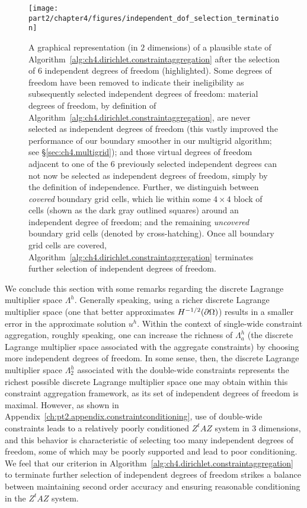 \begin{figure}[htbp]
\begin{center}
\texttt{[image: part2/chapter4/figures/independent\_dof\_selection\_termination]}
\caption{A graphical representation (in $2$ dimensions) of a plausible state of Algorithm~\ref{alg:ch4.dirichlet.constraintaggregation} after the selection of $6$ independent degrees of freedom (highlighted). Some degrees of freedom have been removed to indicate their ineligibility as subsequently selected independent degrees of freedom: material degrees of freedom, by definition of Algorithm~\ref{alg:ch4.dirichlet.constraintaggregation}, are never selected as independent degrees of freedom (this vastly improved the performance of our boundary smoother in our multigrid algorithm; see \S\ref{sec:ch4.multigrid}); and those virtual degrees of freedom adjacent to one of the $6$ previously selected independent degrees can not now be selected as independent degrees of freedom, simply by the definition of independence. Further, we distinguish between \emph{covered} boundary grid cells, which lie within some $4 \times 4$ block of cells (shown as the dark gray outlined squares) around an independent degree of freedom; and the remaining \emph{uncovered} boundary grid cells (denoted by cross-hatching). Once all boundary grid cells are covered, Algorithm~\ref{alg:ch4.dirichlet.constraintaggregation} terminates further selection of independent degrees of freedom.}
\label{fig:ch4.indydoftermination}
\end{center}
\end{figure}

We conclude this section with some remarks regarding the discrete Lagrange multiplier space $\Lambda^h$. Generally speaking, using a richer discrete Lagrange multiplier space (one that better approximates $H^{-1/2}(\partial\Omega)$) results in a smaller error in the approximate solution $u^h$. Within the context of single-wide constraint aggregation, roughly speaking, one can increase the richness of $\Lambda^h_a$ (the discrete Lagrange multiplier space associated with the aggregate constraints) by choosing more independent degrees of freedom. In some sense, then, the discrete Lagrange multiplier space $\Lambda^h_2$ associated with the double-wide constraints represents the richest possible discrete Lagrange multiplier space one may obtain within this constraint aggregation framework, as its set of independent degrees of freedom is maximal. However, as shown in Appendix~\ref{ch:pt2.appendix.constraintconditioning}, use of double-wide constraints leads to a relatively poorly conditioned $Z^tAZ$ system in $3$ dimensions, and this behavior is characteristic of selecting too many independent degrees of freedom, some of which may be poorly supported and lead to poor conditioning. We feel that our criterion in Algorithm~\ref{alg:ch4.dirichlet.constraintaggregation} to terminate further selection of independent degrees of freedom strikes a balance between maintaining second order accuracy and ensuring reasonable conditioning in the $Z^tAZ$ system.

